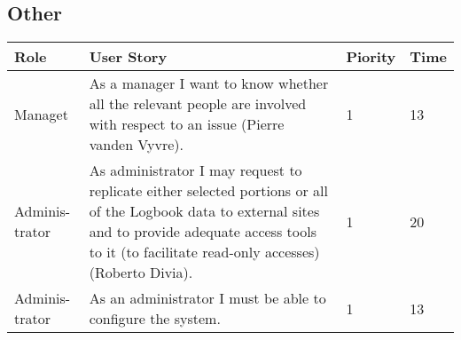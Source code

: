 \subsection{Other}
\begin{longtable}{ | p{2cm} | p{8cm} | p{1.5cm} | l |}
\hline
Role & User Story & Piority & Time \\ \hline
Managet & As a manager I want to know whether all the relevant people are
involved with respect to an issue (Pierre vanden Vyvre). & 1 & 13 \\ \hline
Adminis-trator & As administrator I may request to replicate either selected portions
or all of the Logbook data to external sites and to provide adequate access tools to it (to facilitate read-only accesses) (Roberto Divia). & 1 & 20 \\ \hline
Adminis-trator & As an administrator I must be able to configure the system. & 1 & 13 \\ \hline


\end{longtable}

